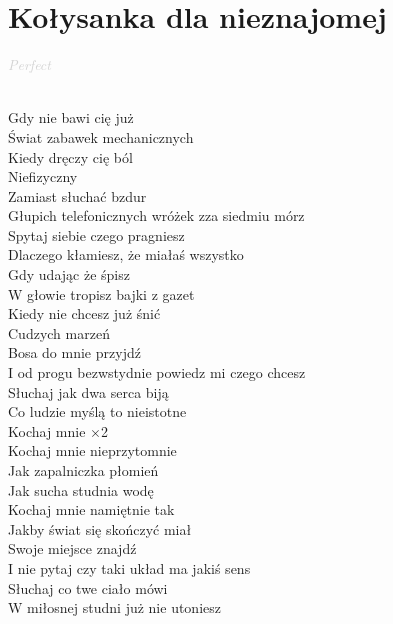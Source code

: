 \documentclass[a5paper, 10pt]{book}
\begin{document}
\section{Kołysanka dla nieznajomej}\textcolor{lightgray}{\textit{Perfect}}\\~\\
\begin{minipage}[t]{0.7\textwidth}
Gdy nie bawi cię już\\
Świat zabawek mechanicznych\\
Kiedy dręczy cię ból\\
Niefizyczny\\
Zamiast słuchać bzdur\\
Głupich telefonicznych wróżek zza siedmiu mórz\\
Spytaj siebie czego pragniesz\\
Dlaczego kłamiesz, że miałaś wszystko\\

Gdy udając że śpisz\\
W głowie tropisz bajki z gazet\\
Kiedy nie chcesz już śnić\\
Cudzych marzeń\\
Bosa do mnie przyjdź\\
I od progu bezwstydnie powiedz mi czego chcesz\\
Słuchaj jak dwa serca biją\\
Co ludzie myślą to nieistotne\\

\hspace*{5mm}Kochaj mnie   \hspace*{8mm} $\times$2\\
\hspace*{5mm}Kochaj mnie nieprzytomnie\\
\hspace*{5mm}Jak zapalniczka płomień\\
\hspace*{5mm}Jak sucha studnia wodę\\
\hspace*{5mm}Kochaj mnie namiętnie tak\\
\hspace*{5mm}Jakby świat się skończyć miał\\

Swoje miejsce znajdź\\
I nie pytaj czy taki układ ma jakiś sens\\
Słuchaj co twe ciało mówi\\
W miłosnej studni już nie utoniesz\\


\end{minipage}
\end{document}
